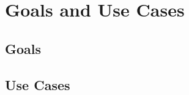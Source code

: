 \chapter{Goals and Use Cases}
\label{ch:Goals and Use Cases}


\section{Goals}

\section{Use Cases}
